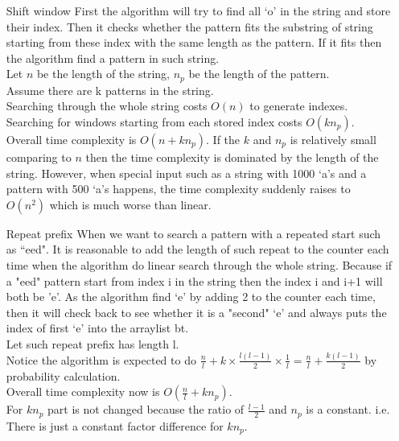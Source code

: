 \documentclass[10pt,twoside,a4paper]{article}
\begin{document}
\begin{itemize}

\item[Shift window]
First the algorithm will try to find all `o' in the string and store their index. Then it checks whether the pattern fits the substring of string starting from these index with the same length as the pattern. If it fits then the algorithm find a pattern in such string.
\\Let $n$ be the length of the string, $n_p$ be the length of the pattern.
\\Assume there are k patterns in the string.
\\Searching through the whole string costs $O(n)$ to generate indexes.
\\Searching for windows starting from each stored index costs $O(kn_p)$.
\\Overall time complexity is $O(n+kn_p)$. If the $k$ and $n_p$ is relatively small comparing to $n$ then the time complexity is dominated by the length of the string. However, when special input such as a string with 1000 `a's and a pattern with 500 `a's happens, the time complexity suddenly raises to $O(n^2)$ which is much worse than linear.
\item[Repeat prefix]
When we want to search a pattern with a repeated start such as ``eed". It is reasonable to add the length of such repeat to the counter each time when the algorithm do linear search through the whole string. Because if a "eed" pattern start from index i in the string then the index i and i+1 will both be 'e'. As the algorithm find `e' by adding 2 to the counter each time, then it will check back to see whether it is a "second" `e' and always puts the index of first `e' into the arraylist bt.
\\Let such repeat prefix has length l.
\\Notice the algorithm is expected to do $\frac{n}{l}+k\times\frac{l(l-1)}{2}\times\frac{1}{l}=\frac{n}{l}+\frac{k(l-1)}{2}$ by probability calculation.
\\Overall time complexity now is $O(\frac{n}{l}+kn_p)$.
\\For $kn_p$ part is not changed because the ratio of $\frac{l-1}{2}$ and $n_p$ is a constant. i.e. There is just a constant factor difference for $kn_p$.


\end{itemize}
\end{document}
